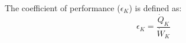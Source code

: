 The coefficient of performance (\(\epsilon_K\)) is defined as:  
\[
\epsilon_K = \frac{\dot{Q}_K}{\dot{W}_K}
\]